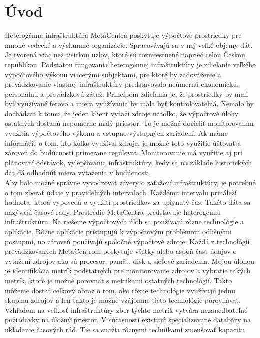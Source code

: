 \documentclass[printed,11pt,twoside,color,cover,table]{fithesis3}
\begin{document}
\chapter{Úvod}
Heterogénna infraštruktúra MetaCentra poskytuje výpočtové prostriedky pre mnohé vedecké a výskumné organizácie. Spracovávajú sa v nej veľké objemy dát. Je tvorená viac než tisíckou uzlov, ktoré sú
rozmiestnené naprieč celou
Českou republikou. Podstatou fungovania heterogénnej infraštruktúry je zdieľanie veľkého výpočtového výkonu viacerými subjektami, pre ktoré by zadováženie a prevádzkovanie vlastnej infraštruktúry predstavovalo neúmernú 
ekonomickú, personálnu a prevádzkovú záťaž. Princípom zdieľania je, že prostriedky by mali byť využívané férovo a miera využívania by
mala byť kontrolovateľná. Nemalo by dochádzať k tomu, že jeden klient vyťaží zdroje natoľko, že 
výpočtové úlohy ostatných dostanú nepomerne malý priestor. To je možné docieliť monitorovaním využitia výpočtového výkonu a vstupno-výstupných zariadení. Ak máme informácie o tom, kto koľko využíval zdroje, 
je možné toto využitie účtovať a zároveň do budúcnosti primerane regulovať. Monitorovanie má využitie aj pri plánovaní
odstávok, vylepšovania infraštruktúry, kedy sa na základe historických dát dá odhadnúť miera vyťaženia v budúcnosti.
\\Aby bolo možné správne vyvodzovať závery o zaťažení infraštruktúry, je potrebné o tom zberať údaje v pravidelných intervaloch. Každému intervalu 
prináleží hodnota, ktorá vypovedá o využití prostriedkov za uplynutý čas. Takéto dáta sa nazývajú časové rady.
Prostredie MetaCentra predstavuje heterogénnu infraštruktúru. Na riešenie výpočtových úloh sa používajú rôzne technológie a aplikácie. 
Rôzne aplikácie pristupujú k výpočtovým problémom odlišnými postupmi,
no zároveň používajú spoločné výpočtové zdroje. Každá z technológií prevádzkovaných MetaCentrom poskytuje všetky alebo aspoň časť údajov 
o vyťažení zdrojov ako sú procesor, pamäť, disk a sieťové zariadenia. Mojou úlohou je identifikácia metrík podstatných pre monitorovanie 
zdrojov a vybratie takých metrík, ktoré je možné porovnať s metrikami ostatných technológií. Takto môžeme dostať celkový obraz o tom, ako rôzne technológie využívajú jednu skupinu zdrojov a len takto je možné vzájomne tieto technológie 
porovnávať.
\\Vzhľadom na veľkosť infraštruktúry zber týchto metrík vytvára nezanedbateľné požiadavky na úložný priestor. 
V súčasnosti existujú špecializované databázy na ukladanie časových rád. Tie sa snažia rôznymi technikami zmenšovať kapacitu
\end{document}
